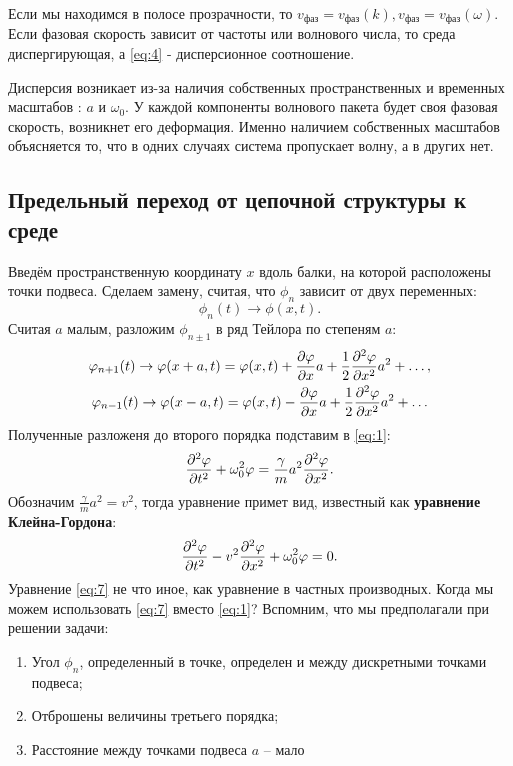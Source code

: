 Если мы находимся в полосе прозрачности, то $v_\text{фаз}=v_\text{фаз}(k), v_\text{фаз}=v_\text{фаз}(\omega)$. Если фазовая скорость зависит от частоты или волнового числа, то среда диспергирующая, а \eqref{eq:4} - дисперсионное соотношение. 

Дисперсия возникает из-за наличия собственных пространственных и временных масштабов : $a$ и $\omega_0$. У каждой компоненты волнового пакета будет своя фазовая скорость, возникнет его деформация. Именно наличием собственных масштабов объясняется то, что в одних случаях система пропускает волну, а в других нет.





\subsection{Предельный переход от цепочной структуры к среде}
Введём пространственную координату $x$ вдоль балки, на которой расположены точки подвеса. Сделаем замену, считая, что $\phi_n$ зависит от двух переменных:
\begin{equation*}
	\phi_n(t) \rightarrow \phi(x,t).
\end{equation*}
Считая $a$ малым, разложим $\phi_{n\pm 1}$ в ряд Тейлора по степеням $a$:
\begin{gather}
	\varphi_{n+1}(t) \rightarrow \varphi(x+a,t)=\varphi(x,t)+\pdv{\varphi}{x}a +\frac12 \pdv[2]{\varphi}{x}a^2+\ldots,\\\nonumber
	\varphi_{n-1}(t) \rightarrow \varphi(x-a,t)=\varphi(x,t)-\pdv{\varphi}{x}a +\frac12 \pdv[2]{\varphi}{x}a^2+\ldots
	\label{eq:6}
\end{gather}
Полученные разложеня до второго порядка подставим в \eqref{eq:1}:
\begin{gather*}
	\pdv[2]{\varphi}{t} + \omega_0^2 \varphi=\frac{\gamma}{m}a^2 \pdv[2]{\varphi}{x}.
\end{gather*}
Обозначим $\frac{\gamma}{m}a^2 = v^2$, тогда уравнение  примет вид, известный как \textbf{уравнение Клейна-Гордона}:
\begin{equation}
	\pdv[2]{\varphi}{t}-v^2\pdv[2]{\varphi}{x}+\omega_0^2\varphi=0.
	\label{eq:7}
\end{equation}
Уравнение \eqref{eq:7} не что иное, как уравнение в частных производных. Когда мы можем использовать \eqref{eq:7} вместо \eqref{eq:1}? Вспомним, что мы предполагали при решении задачи:
\begin{enumerate}
	\item Угол $\phi_n$, определенный в точке, определен и между дискретными точками подвеса;
	\item Отброшены величины третьего порядка;
	\item Расстояние между точками подвеса $a$ -- мало
\end{enumerate}

